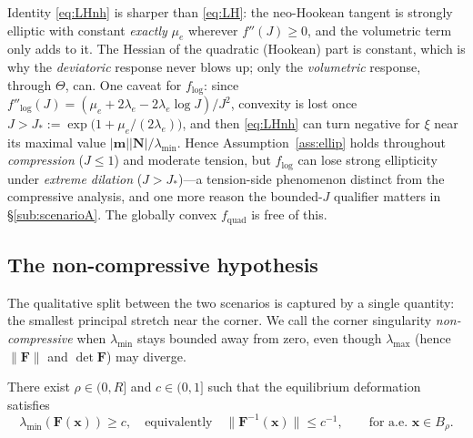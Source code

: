 \begin{remark}
    \label{rem:SEcaveat}
    Identity \eqref{eq:LHnh} is sharper than \eqref{eq:LH}: the neo-Hookean tangent is strongly elliptic with constant
    \emph{exactly} $\mu_e$ wherever $f''(J)\ge0$, and the volumetric term only adds to it. The Hessian of the quadratic
    (Hookean) part is constant, which is why the \emph{deviatoric} response never blows up; only the \emph{volumetric}
    response, through $\Theta$, can. One caveat for $f_{\log}$: since
    $f''_{\log}(J)=(\mu_e+2\lambda_e-2\lambda_e\log J)/J^2$, convexity is lost once
    $J>J_*:=\exp\!\big(1+\mu_e/(2\lambda_e)\big)$, and then \eqref{eq:LHnh} can turn negative for $\xi$ near its maximal
    value $|\bm{m}||\bm{N}|/\lambda_{\min}$. Hence Assumption~\ref{ass:ellip} holds throughout \emph{compression}
    ($J\le1$) and moderate tension, but $f_{\log}$ can lose strong ellipticity under \emph{extreme dilation}
    ($J>J_*$)---a tension-side phenomenon distinct from the compressive analysis, and one more reason the bounded-$J$
    qualifier matters in \S\ref{sub:scenarioA}. The globally convex $f_{\mathrm{quad}}$ is free of this.
\end{remark}

\subsection{The non-compressive hypothesis}

The qualitative split between the two scenarios is captured by a single quantity: the smallest principal stretch near
the corner. We call the corner singularity \emph{non-compressive} when $\lambda_{\min}$ stays bounded away from zero,
even though $\lambda_{\max}$ (hence $\|\bm{F}\|$ and $\det\bm{F}$) may diverge.

\begin{assumption}
    \label{ass:nc}
    There exist $\rho\in(0,R]$ and $c\in(0,1]$ such that the equilibrium deformation satisfies
    \begin{equation}
        \label{eq:NC}
        \lambda_{\min}(\bm{F}(\bm{x})) \ge c, \quad\text{equivalently}\quad \|\bm{F}^{-1}(\bm{x})\|\le c^{-1},
        \qquad \text{for a.e. } \bm{x}\in B_\rho .
    \end{equation}
\end{assumption}

